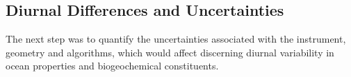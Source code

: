 \documentclass[onecolumn,3p,letterpaper,11pt]{elsarticle}
\begin{document}

 

\subsection{Diurnal Differences and Uncertainties}
The next step was to quantify the uncertainties associated with the instrument, geometry and algorithms, which would affect discerning diurnal variability in ocean properties and biogeochemical constituents. 
\end{document}
